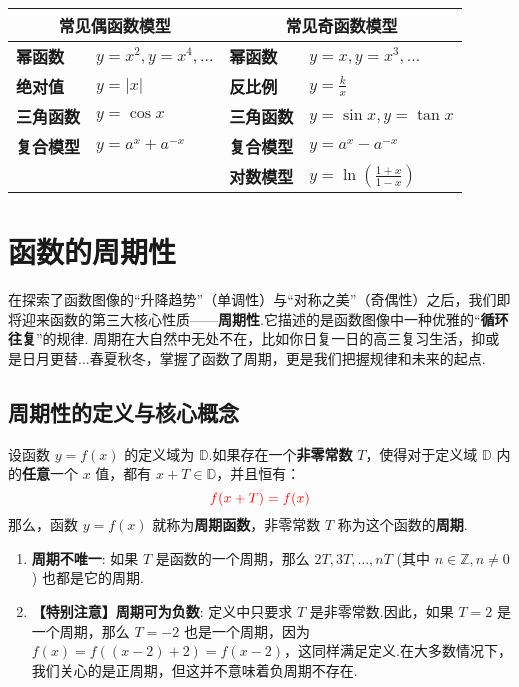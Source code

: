 \begin{note}[模型总结表]
	\begin{center}
		\begin{tabularx}{\linewidth}{lXlX}
			\toprule
			\multicolumn{2}{c}{\textbf{常见偶函数模型}} & \multicolumn{2}{c}{\textbf{常见奇函数模型}} \\
			\midrule
			\textbf{幂函数} & $y=x^2, y=x^4, \dots$ & \textbf{幂函数} & $y=x, y=x^3, \dots$ \\
			\textbf{绝对值} & $y=|x|$ & \textbf{反比例} & $y=\frac{k}{x}$ \\
			\textbf{三角函数} & $y=\cos x$ & \textbf{三角函数} & $y=\sin x, y=\tan x$ \\
			\textbf{复合模型} & $y=a^x+a^{-x}$ & \textbf{复合模型} & $y=a^x-a^{-x}$ \\
			& & \textbf{对数模型} & $y=\ln\left(\frac{1+x}{1-x}\right)$ \\
			\bottomrule
		\end{tabularx}
	\end{center}
\end{note}

\section{函数的周期性}


\lettrine{在}{探索了}函数图像的“升降趋势”（单调性）与“对称之美”（奇偶性）之后，我们即将迎来函数的第三大核心性质——\textbf{周期性}.它描述的是函数图像中一种优雅的“\textbf{循环往复}”的规律. 周期在大自然中无处不在，比如你日复一日的高三复习生活，抑或是日月更替...春夏秋冬，掌握了函数了周期，更是我们把握规律和未来的起点.


\subsection{周期性的定义与核心概念}

\begin{definition}[周期函数]
	设函数 $y=f(x)$ 的定义域为 $\mathbb{D}$.如果存在一个\textbf{非零常数} $T$，使得对于定义域 $\mathbb{D}$ 内的\textbf{任意}一个 $x$ 值，都有 $x+T \in \mathbb{D}$，并且恒有：
	\begin{equation}
		\textcolor{red}{f(x+T) = f(x)}
	\end{equation}
	那么，函数 $y=f(x)$ 就称为\textbf{周期函数}，非零常数 $T$ 称为这个函数的\textbf{周期}.
\end{definition}

\begin{note}[关于周期的深入理解]
	\begin{enumerate}
		\item \textbf{周期不唯一}: 如果 $T$ 是函数的一个周期，那么 $2T, 3T, \dots, nT$ (其中 $n \in \mathbb{Z}, n \neq 0$) 也都是它的周期.
		\item \textbf{【特别注意】周期可为负数}: 定义中只要求 $T$ 是非零常数.因此，如果 $T=2$ 是一个周期，那么 $T=-2$ 也是一个周期，因为 $f(x) = f((x-2)+2)=f(x-2)$，这同样满足定义.在大多数情况下，我们关心的是正周期，但这并不意味着负周期不存在.
	\end{enumerate}
\end{note}

